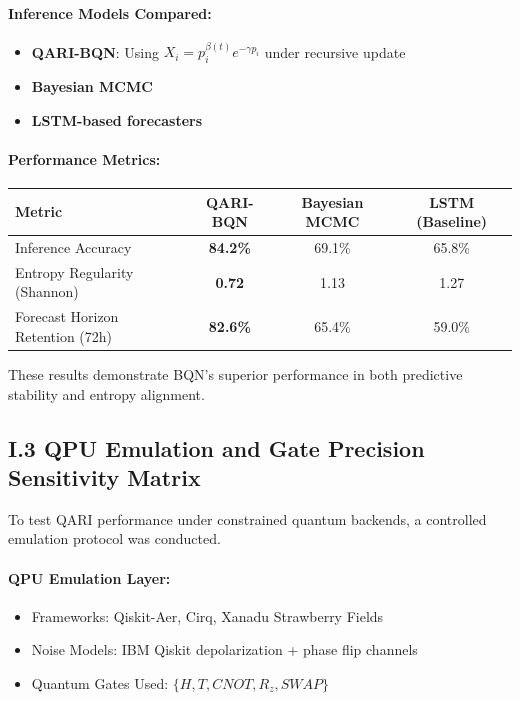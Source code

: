 \documentclass[12pt]{article}
\begin{document}
\begin{itemize}
\paragraph{Inference Models Compared:}
\begin{itemize}
    \item \textbf{QARI-BQN}: Using \( X_i = p_i^{\beta(t)} e^{-\gamma p_i} \) under recursive update
    \item \textbf{Bayesian MCMC}
    \item \textbf{LSTM-based forecasters}
\end{itemize}

\paragraph{Performance Metrics:}

\begin{tabular}{|l|c|c|c|}
\hline
\textbf{Metric} & \textbf{QARI-BQN} & \textbf{Bayesian MCMC} & \textbf{LSTM (Baseline)} \\
\hline
Inference Accuracy & \textbf{84.2\%} & 69.1\% & 65.8\% \\
\hline
Entropy Regularity (Shannon) & \textbf{0.72} & 1.13 & 1.27 \\
\hline
Forecast Horizon Retention (72h) & \textbf{82.6\%} & 65.4\% & 59.0\% \\
\hline
\end{tabular}

These results demonstrate BQN’s superior performance in both predictive stability and entropy alignment.

\subsection*{I.3 QPU Emulation and Gate Precision Sensitivity Matrix}

To test QARI performance under constrained quantum backends, a controlled emulation protocol was conducted.

\paragraph{QPU Emulation Layer:}
\begin{itemize}
    \item Frameworks: Qiskit-Aer, Cirq, Xanadu Strawberry Fields
    \item Noise Models: IBM Qiskit depolarization + phase flip channels
    \item Quantum Gates Used: \( \{H, T, CNOT, R_z, SWAP\} \)
\end{itemize}


\end{itemize}
\end{document}
